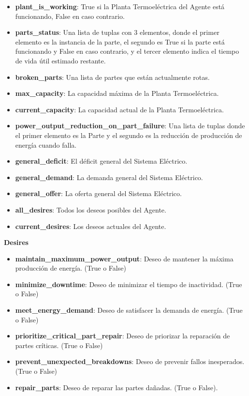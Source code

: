 \documentclass[twocolumn, fontsize=10pt]{article}
\begin{document}
\begin{itemize}
  \item \textbf{plant\_is\_working}: True si la Planta Termoeléctrica del Agente está funcionando, False en caso contrario.
  \item \textbf{parts\_status}: Una lista de tuplas con 3 elementos, donde el primer elemento es la instancia de la parte, el segundo es True si la parte está funcionando y False en caso contrario, y el tercer elemento indica el tiempo de vida útil estimado restante.
  \item \textbf{broken\_parts}: Una lista de partes que están actualmente rotas.
  \item \textbf{max\_capacity}: La capacidad máxima de la Planta Termoeléctrica.
  \item \textbf{current\_capacity}: La capacidad actual de la Planta Termoeléctrica.
  \item \textbf{power\_output\_reduction\_on\_part\_failure}: Una lista de tuplas donde el primer elemento es la Parte y el segundo es la reducción de producción de energía cuando falla.
  \item \textbf{general\_deficit}: El déficit general del Sistema Eléctrico.
  \item \textbf{general\_demand}: La demanda general del Sistema Eléctrico.
  \item \textbf{general\_offer}: La oferta general del Sistema Eléctrico.
  \item \textbf{all\_desires}: Todos los deseos posibles del Agente.
  \item \textbf{current\_desires}: Los deseos actuales del Agente.
\end{itemize}
\textbf{Desires}
\begin{itemize}
  
  \item \textbf{maintain\_maximum\_power\_output}: Deseo de mantener la máxima producción de energía. (True o False)
  \item \textbf{minimize\_downtime}: Deseo de minimizar el tiempo de inactividad. (True o False)
  \item \textbf{meet\_energy\_demand}: Deseo de satisfacer la demanda de energía. (True o False)
  \item \textbf{prioritize\_critical\_part\_repair}: Deseo de priorizar la reparación de partes críticas. (True o False)
  \item \textbf{prevent\_unexpected\_breakdowns}: Deseo de prevenir fallos inesperados. (True o False)
  \item \textbf{repair\_parts}: Deseo de reparar las partes dañadas. (True o False).

\end{itemize}
\end{document}
